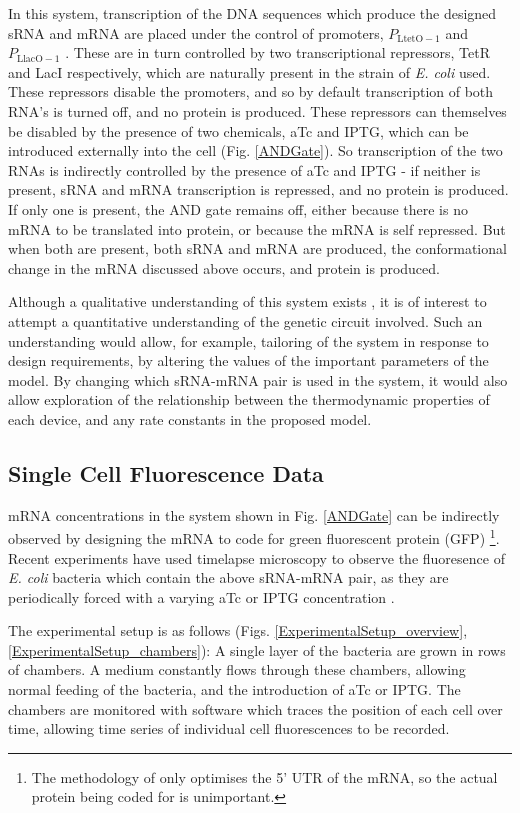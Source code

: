 \documentclass[10pt,journal]{./IEEE_latex_class/IEEEtran}
\begin{document}
In this system, transcription of the DNA sequences which produce the designed sRNA and mRNA are placed under the control of promoters, $P_{\mathrm{LtetO-1}}$ and $P_\mathrm{LlacO-1}$ \cite{Lutz1997}. These are in turn controlled by two transcriptional repressors, TetR and LacI respectively, which are naturally present in the strain of \textit{E. coli} used. These repressors disable the promoters, and so by default transcription of both RNA's is turned off, and no protein is produced. 
These repressors can themselves be disabled by the presence of two chemicals, aTc and IPTG, which can be introduced externally into the cell (Fig. \ref{ANDGate}).  So transcription of the two RNAs is indirectly controlled by the presence of aTc and IPTG - if neither is present, sRNA and mRNA transcription is repressed, and no protein is produced. If only one is present, the AND gate remains off, either because there is no mRNA to be translated into protein, or because the mRNA is self repressed. But when both are present, both sRNA and mRNA are produced, the conformational change in the mRNA discussed above occurs, and protein is produced.

Although a qualitative understanding of this system exists \cite{Rodrigo2012}, it is of interest to attempt a quantitative understanding of the genetic circuit involved. Such an understanding would allow, for example, tailoring of the system in response to design requirements, by altering the values of the important parameters of the model. By changing which sRNA-mRNA pair is used in the system, it would also allow exploration of the relationship between the thermodynamic properties of each device, and any rate constants in the proposed model.
 
\subsection{Single Cell Fluorescence Data}

mRNA concentrations in the system shown in Fig. \ref{ANDGate} can be indirectly observed by designing the mRNA to code for green fluorescent protein (GFP) \footnote{ The methodology of \cite{Rodrigo2012} only optimises the 5' UTR of the mRNA, so the actual protein being coded for is unimportant.}. Recent experiments have used timelapse microscopy to observe the fluoresence of \textit{E. coli} bacteria which contain the above sRNA-mRNA pair, as they are periodically forced with a varying aTc or IPTG concentration \cite{Jaramillo}. 

The experimental setup is as follows (Figs. \ref{ExperimentalSetup_overview},  \ref{ExperimentalSetup_chambers}): A single layer of the bacteria are grown in rows of chambers. A medium constantly flows through these chambers, allowing normal feeding of the bacteria, and the introduction of aTc or IPTG. The chambers are monitored with software which traces the position of each cell over time, allowing time series of individual cell fluorescences to be recorded.
\end{document}

